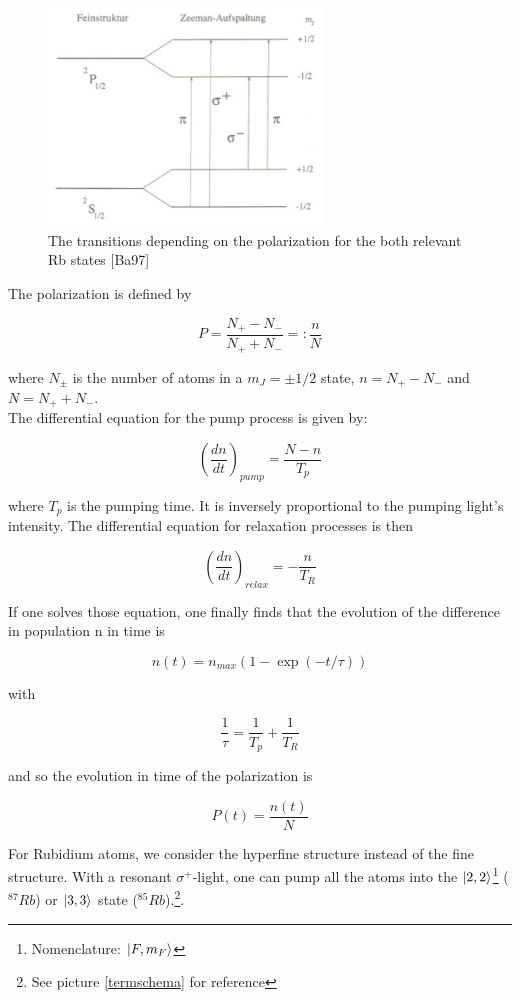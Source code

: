 \begin{figure}[H]
\centering \includegraphics[width = 0.65\textwidth]{BilderTheo/OP-Prinzip.png}
\caption{The transitions depending on the polarization for the both relevant Rb states [Ba97]}
\end{figure}

The polarization is defined by

$$ P =\frac{N_+ - N_-}{N_+ + N_-} =: \frac{n}{N} $$

where $N_\pm$ is the number of atoms in a $m_J = \pm 1/2$ state, $n= N_+ - N_-$ and $N = N_+ + N_-$.\\

The differential equation for the pump process is given by:

$$ \left(\frac{dn}{dt}\right)_{pump} = \frac{N-n}{T_p} $$

where $T_p$ is the pumping time. It is inversely proportional to the pumping light's intensity. The differential equation for relaxation processes is then

$$ \left(\frac{dn}{dt}\right)_{relax} = -\frac{n}{T_R} $$

If one solves those equation, one finally finds that the evolution of the difference in population n in time is

$$ n(t) = n_{max}\left(1-\exp(-t/\tau)\right) $$

with

$$ \frac{1}{\tau} = \frac{1}{T_p} + \frac{1}{T_R} $$

and so the evolution in time of the polarization is

$$P(t) = \frac{n(t)}{N} $$

For Rubidium atoms, we consider the hyperfine structure instead of the fine structure. With a resonant $\sigma^+$-light, one can pump all the atoms into the $\ket{2,2}$\footnote{Nomenclature: $\ket{F,m_F}$} ($^{87}Rb$) or $\ket{3,3}$ state ($^{85}Rb$).\footnote{See picture \ref{termschema} for reference}.

